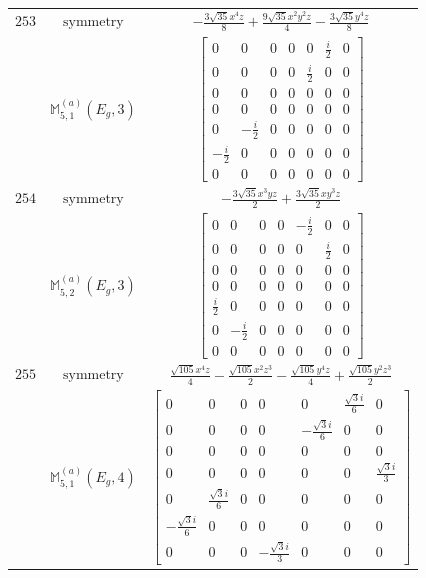 \documentclass[fleqn,8pt,landscape]{jsarticle}
\begin{document}
\begin{longtable}{ccc}
$ 253 $ & $ \text{symmetry} $ & $ - \frac{3 \sqrt{35} x^{4} z}{8} + \frac{9 \sqrt{35} x^{2} y^{2} z}{4} - \frac{3 \sqrt{35} y^{4} z}{8} $ \\
$  $ & $ \mathbb{M}_{5,1}^{(a)}(E_{g},3) $ & $ \begin{bmatrix} 0 & 0 & 0 & 0 & 0 & \frac{i}{2} & 0 \\ 0 & 0 & 0 & 0 & \frac{i}{2} & 0 & 0 \\ 0 & 0 & 0 & 0 & 0 & 0 & 0 \\ 0 & 0 & 0 & 0 & 0 & 0 & 0 \\ 0 & - \frac{i}{2} & 0 & 0 & 0 & 0 & 0 \\ - \frac{i}{2} & 0 & 0 & 0 & 0 & 0 & 0 \\ 0 & 0 & 0 & 0 & 0 & 0 & 0 \end{bmatrix} $ \\ \hline
$ 254 $ & $ \text{symmetry} $ & $ - \frac{3 \sqrt{35} x^{3} y z}{2} + \frac{3 \sqrt{35} x y^{3} z}{2} $ \\
$  $ & $ \mathbb{M}_{5,2}^{(a)}(E_{g},3) $ & $ \begin{bmatrix} 0 & 0 & 0 & 0 & - \frac{i}{2} & 0 & 0 \\ 0 & 0 & 0 & 0 & 0 & \frac{i}{2} & 0 \\ 0 & 0 & 0 & 0 & 0 & 0 & 0 \\ 0 & 0 & 0 & 0 & 0 & 0 & 0 \\ \frac{i}{2} & 0 & 0 & 0 & 0 & 0 & 0 \\ 0 & - \frac{i}{2} & 0 & 0 & 0 & 0 & 0 \\ 0 & 0 & 0 & 0 & 0 & 0 & 0 \end{bmatrix} $ \\ \hline
$ 255 $ & $ \text{symmetry} $ & $ \frac{\sqrt{105} x^{4} z}{4} - \frac{\sqrt{105} x^{2} z^{3}}{2} - \frac{\sqrt{105} y^{4} z}{4} + \frac{\sqrt{105} y^{2} z^{3}}{2} $ \\
$  $ & $ \mathbb{M}_{5,1}^{(a)}(E_{g},4) $ & $ \begin{bmatrix} 0 & 0 & 0 & 0 & 0 & \frac{\sqrt{3} i}{6} & 0 \\ 0 & 0 & 0 & 0 & - \frac{\sqrt{3} i}{6} & 0 & 0 \\ 0 & 0 & 0 & 0 & 0 & 0 & 0 \\ 0 & 0 & 0 & 0 & 0 & 0 & \frac{\sqrt{3} i}{3} \\ 0 & \frac{\sqrt{3} i}{6} & 0 & 0 & 0 & 0 & 0 \\ - \frac{\sqrt{3} i}{6} & 0 & 0 & 0 & 0 & 0 & 0 \\ 0 & 0 & 0 & - \frac{\sqrt{3} i}{3} & 0 & 0 & 0 \end{bmatrix} $ \\ \hline

\end{longtable}
\end{document}
